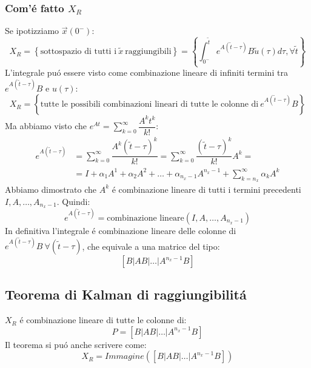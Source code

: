 \documentclass[../main.tex]{subfiles}
\begin{document}
	\subsubsection{Com'\'e fatto $ X_R $}
		Se ipotizziamo $ \vec x(0^-) $:
		\[
			X_R = \left\lbrace \text{sottospazio di tutti i}\ \tilde x\ \text{raggiungibili} \right\rbrace = \left\lbrace \int_{0^-}^{\tilde t} e^{A(\tilde t - \tau)} B \tilde u(\tau) d\tau, \forall \tilde t \right\rbrace
		\]
		L'integrale pu\'o essere visto come combinazione lineare di infiniti termini tra $ e^{A(\tilde t - \tau)} B $ e $ u(\tau) $:
		\[
			X_R = \left\lbrace \text{tutte le possibili combinazioni lineari di tutte le colonne di}\ e^{A(\tilde t - \tau)} B \right\rbrace
		\]
		Ma abbiamo visto che $ e^{At} = \sum_{k=0}^{\infty} \dfrac{A^k t^k}{k!} $:
		\begin{align*}
			e^{A(\tilde t - \tau)} &= \sum_{k=0}^{\infty} \dfrac{A^k (\tilde t - \tau)^k}{k!} = \sum_{k=0}^{\infty} \dfrac{(\tilde t - \tau)^k}{k!} A^k =
			\\
			&= I + \alpha_1 A^1 + \alpha_2 A^2 + \dots + \alpha_{n_x-1} A^{n_x-1} + \sum_{k=n_x}^{\infty} \alpha_k A^k
		\end{align*}		
		Abbiamo dimostrato che $ A^k $ \'e combinazione lineare di tutti i termini precedenti $ I, A, \dots, A_{n_x-1} $. Quindi:
		\[
			e^{A(\tilde t - \tau)} = \text{combinazione lineare}(I, A, \dots, A_{n_x-1})
		\]
		In definitiva l'integrale \'e combinazione lineare delle colonne di $ e^{A(\tilde t - \tau)} B\ \forall (\tilde t - \tau) $, che equivale a una matrice del tipo:
		\[
			\left[ B | AB | \dots | A^{n_x-1} B \right]
		\]

	\subsection{Teorema di Kalman di raggiungibilit\'a}
		$ X_R $ \'e combinazione lineare di tutte le colonne di:
		\[
			P = \left[ B | AB | \dots | A^{n_x-1} B \right]
		\]
		Il teorema si pu\'o anche scrivere come:
		\[ 
			X_R = Immagine\left( \left[ B | AB | \dots | A^{n_x-1} B \right] \right)
		\]
		
\end{document}
